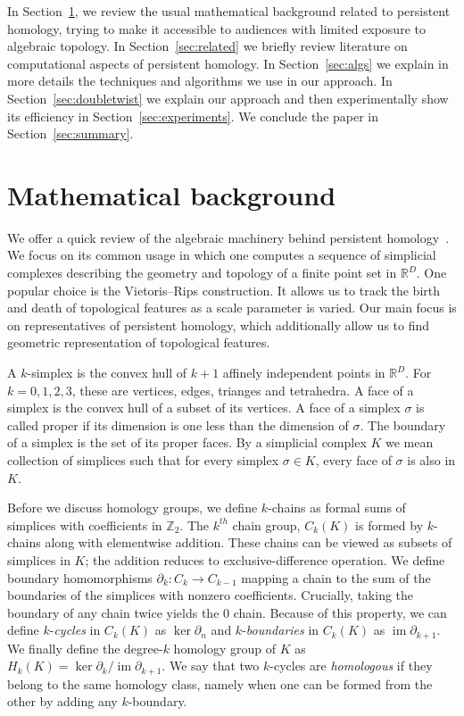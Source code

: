  In Section~\ref{sec:background}, we review the usual mathematical background related to persistent homology, trying to make it accessible to audiences with limited exposure to algebraic topology. In Section~\ref{sec:related} we briefly review literature on computational aspects of persistent homology. In Section~\ref{sec:algs} we explain in more details the techniques and algorithms we use in our approach. In Section~\ref{sec:doubletwist} we explain our approach and then experimentally show its efficiency in Section~\ref{sec:experiments}. We conclude the paper in Section~\ref{sec:summary}.


\section{Mathematical background}
\label{sec:background}
We offer a quick review of the algebraic machinery behind persistent homology~\cite{edelsbrunner2010computational}. We focus on its common usage in which one computes a sequence of simplicial complexes describing the geometry and topology of a finite point set in $\mathbb{R}^D$. One popular choice is the Vietoris--Rips construction. It allows us to track the birth and death of topological features as a scale parameter is varied. Our main focus is on representatives of persistent homology, which additionally allow us to find geometric representation of topological features. 

A $k$-simplex is the convex hull of $k+1$ affinely independent points in $\mathbb{R}^D$. For $k = 0,1,2,3$, these are vertices, edges, trianges and tetrahedra. A face of a simplex is the convex hull of a subset of its vertices. A face of a simplex $\sigma$ is called proper if its dimension is one less than the dimension of $\sigma$. The boundary of a simplex is the set of its proper faces. By a simplicial complex $K$ we mean collection of simplices such that for every simplex $\sigma\in K$, every face of $\sigma$ is also in $K$. 

Before we discuss homology groups, we define $k$-chains as formal sums of simplices with coefficients in $\mathbb{Z}_2$. The $k^{th}$ chain group, $C_k(K)$ is formed by $k$-chains along with elementwise addition. These chains can be viewed as subsets of simplices in $K$; the addition reduces to exclusive-difference operation. We define boundary homomorphisms $\partial_{k}:C_{k}\to C_{k-1}$ mapping a chain to the sum of the boundaries of the simplices with nonzero coefficients. Crucially, taking the boundary of any chain twice yields the 0 chain. Because of this property, we can define $k$-\textit{cycles} in $C_k(K)$ as $\ker\partial_n$ and $k$-\emph{boundaries} in $C_k(K)$ as $\operatorname{im}\partial_{k+1}$. We finally define the degree-$k$ homology group of $K$ as $H_k(K)=\ker\partial_k/\operatorname{im}\partial_{k+1}$. We say that two $k$-cycles are \emph{homologous} if they belong to the same homology class, namely when one can be formed from the other by adding any $k$-boundary.


